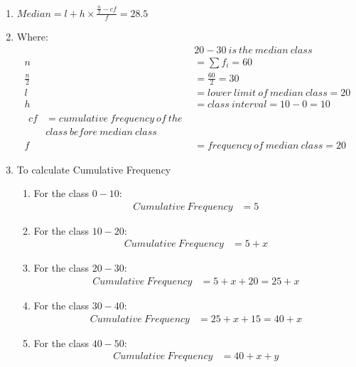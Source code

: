 \renewcommand{\theequation}{\theenumi}

\begin{enumerate}

\item $Median = l + h \times \frac{\frac{n}{2} - cf}{f} = 28.5$

\item Where:
\begin{align*}
&20-30\ is\ the\ median\ class\\
n &= \sum f_i = 60 \\
\frac{n}{2} &= \frac{60}{2} = 30\\
l &= lower\ limit\ of\ median\ class = 20\\
h &= class\ interval = 10 - 0 = 10 \\
\begin{split}
cf &= cumulative\ frequency\ of\ the \\
&class\ before\ median\ class 
\end{split}\\
f &= frequency\ of\ median\ class = 20
\end{align*}

\item To calculate Cumulative Frequency 
\begin{enumerate}

\item For the class $0-10$:
\begin{align*}
Cumulative\ Frequency &= 5
\end{align*}

\item For the class $10-20$:
\begin{align*}
Cumulative\ Frequency &= 5 + x 
\end{align*}

\item For the class $20-30$:
\begin{align*}
Cumulative\ Frequency &= 5 + x + 20 = 25 + x
\end{align*}

\item For the class $30-40$:
\begin{align*}
Cumulative\ Frequency &= 25 + x + 15 = 40 + x 
\end{align*}

\item For the class $40-50$:
\begin{align*}
Cumulative\ Frequency &= 40 + x + y
\end{align*}


\end{enumerate}
\end{enumerate}
